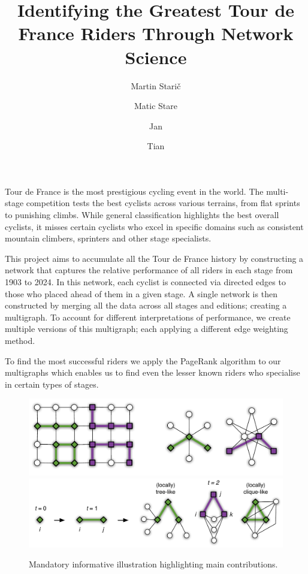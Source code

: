 \documentclass[9pt,twocolumn,twoside]{pnas-report}
\title{Identifying the Greatest Tour de France Riders Through Network Science}
\author[a,2]{Martin Starič}
\author[a,1]{Matic Stare}
\author[a,b]{Jan }
\author[b]{Tian }
\affil[a]{University of Ljubljana, Faculty of Computer and Information Science, Ve\v{c}na pot 113, SI-1000 Ljubljana, Slovenia}
\begin{document}
\maketitle
\thispagestyle{firststyle}

Tour de France is the most prestigious cycling event in the world. The multi-stage competition tests the best cyclists across various terrains,
from flat sprints to punishing climbs. While general classification highlights the best overall cyclists, 
it misses certain cyclists who excel in specific domains such as consistent mountain climbers, sprinters and other stage specialists.

This project aims to accumulate all the Tour de France history by constructing a network that captures the relative performance of all riders in each stage from 1903 to 2024.
In this network, each cyclist is connected via directed edges to those who placed ahead of them in a given stage. A single network is then constructed by merging
all the data across all stages and editions; creating a multigraph. To account for different interpretations of performance, we create multiple versions of this multigraph;
each applying a different edge weighting method.

To find the most successful riders we apply the PageRank algorithm to our multigraphs which
enables us to find even the lesser known riders who specialise in certain types of stages.


\begin{figure}[t]\centering%
	\includegraphics[width=0.9\linewidth]{examples}
	\includegraphics[width=\linewidth]{growth}
	\caption{Mandatory informative illustration highlighting main contributions.~\cite{Sub18a}}
	\label{fig:example}
\end{figure}
\end{document}
